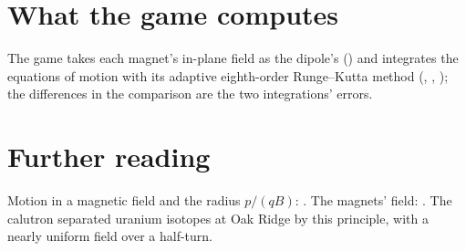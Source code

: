 \documentclass{leveldoc}
\begin{document}
\section{What the game computes}\label{sec:engine}

The game takes each magnet's in-plane field as the dipole's () and integrates the
equations of motion with its adaptive eighth-order Runge--Kutta method (,
, ); the differences in the comparison are the two integrations' errors.

\section{Further reading}\label{sec:reading}

Motion in a magnetic field and the radius $p/(qB)$: . The magnets' field:
. The calutron separated uranium isotopes at Oak Ridge by this principle,
with a nearly uniform field over a half-turn.

\levelfileappendix
\end{document}
